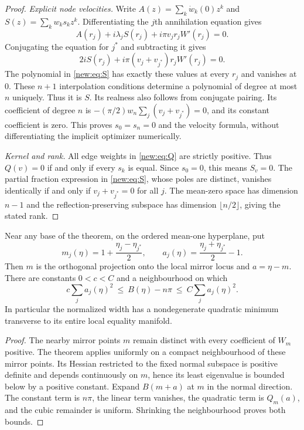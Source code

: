 \begin{proof}
\emph{Explicit node velocities.}
Write
$A(z)=\sum_k\dot w_k(0)z^k$ and
$S(z)=\sum_kw_ks_kz^k$. Differentiating the $j$th annihilation equation
gives
\[
 A(r_j)+i\lambda_jS(r_j)
       +i\pi v_jr_jW'(r_j)=0.
\]
Conjugating the equation for $j^*$ and subtracting it gives
\[
 2iS(r_j)+i\pi(v_j+v_{j^*})r_jW'(r_j)=0.
\]
The polynomial in \eqref{new:eq:S} has exactly these values at every
$r_j$ and vanishes at $0$. These $n+1$ interpolation conditions determine
a polynomial of degree at most $n$ uniquely. Thus it is $S$. Its realness
also follows from conjugate pairing. Its coefficient of degree $n$ is
$-(\pi/2)w_n\sum_j(v_j+v_{j^*})=0$, and its constant coefficient is zero.
This proves $s_0=s_n=0$ and the velocity formula, without differentiating
the implicit optimizer numerically.

\emph{Kernel and rank.}
All edge weights in \eqref{new:eq:Q} are strictly positive. Thus $Q(v)=0$
if and only if every $s_k$ is equal. Since $s_0=0$, this means $S_v=0$.
The partial fraction expression in \eqref{new:eq:S}, whose poles are
distinct, vanishes identically if and only if $v_j+v_{j^*}=0$ for all $j$.
The mean-zero space has dimension $n-1$ and the reflection-preserving
subspace has dimension $\lfloor n/2\rfloor$, giving the stated rank.
\end{proof}

\begin{corollary}
Near any base of the theorem, on the ordered mean-one hyperplane, put
\[
 m_j(\eta)=1+\frac{\eta_j-\eta_{j^*}}2,\qquad
 a_j(\eta)=\frac{\eta_j+\eta_{j^*}}2-1.
\]
Then $m$ is the orthogonal projection onto the local mirror locus and
$a=\eta-m$. There are constants $0<c<C$ and a neighbourhood on which
\[
 c\sum_ja_j(\eta)^2
 \ \leq\ B(\eta)-n\pi\ \leq\ C\sum_ja_j(\eta)^2.
\]
In particular the normalized width has a nondegenerate quadratic minimum
transverse to its entire local equality manifold.
\end{corollary}

\begin{proof}
The nearby mirror points $m$ remain distinct with every coefficient of
$W_m$ positive. The theorem applies uniformly on a compact neighbourhood
of these mirror points. Its Hessian restricted to the fixed normal
subspace is positive definite and depends continuously on $m$, hence its
least eigenvalue is bounded below by a positive constant. Expand
$B(m+a)$ at $m$ in the normal direction. The constant term is $n\pi$,
the linear term vanishes, the quadratic term is $Q_m(a)$, and the cubic
remainder is uniform. Shrinking the neighbourhood proves both bounds.
\end{proof}

